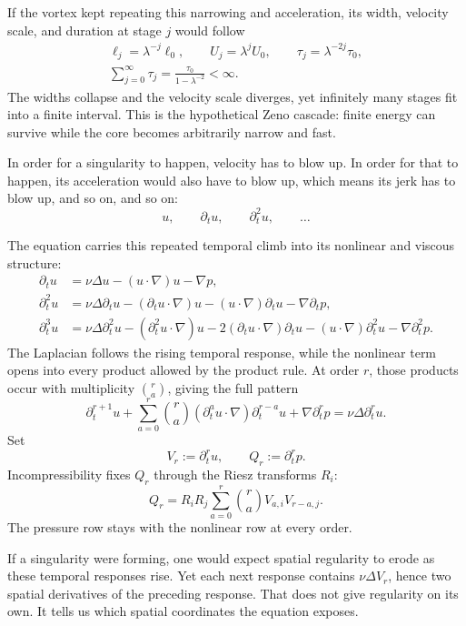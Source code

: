 If the vortex kept repeating this narrowing and acceleration, its width,
velocity scale, and duration at stage \(j\) would follow
\[
\begin{gathered}
 \ell_j=\lambda^{-j}\ell_0,
 \qquad
 U_j=\lambda^jU_0,
 \qquad
 \tau_j=\lambda^{-2j}\tau_0,
 \\
 \sum_{j=0}^{\infty}\tau_j
 =\frac{\tau_0}{1-\lambda^{-2}}<\infty.
\end{gathered}
\]
The widths collapse and the velocity scale diverges, yet infinitely many
stages fit into a finite interval.  This is the hypothetical Zeno cascade:
finite energy can survive while the core becomes arbitrarily narrow and fast.

In order for a singularity to happen, velocity
has to blow up.  In order for that to happen, its acceleration would also have
to blow up, which means its jerk has to blow up, and so on, and so on:
\[
 u,\qquad \partial_tu,\qquad \partial_t^2u,\qquad\ldots
\]

The equation carries this repeated temporal climb into its nonlinear and
viscous structure:
\[
\begin{aligned}
 \partial_tu
 &=\nu\Delta u-(u\!\cdot\nabla)u-\nabla p,\\
 \partial_t^2u
 &=\nu\Delta\partial_tu
   -(\partial_tu\!\cdot\nabla)u
   -(u\!\cdot\nabla)\partial_tu
   -\nabla\partial_tp,\\
 \partial_t^3u
 &=\nu\Delta\partial_t^2u
   -(\partial_t^2u\!\cdot\nabla)u
   -2(\partial_tu\!\cdot\nabla)\partial_tu
   -(u\!\cdot\nabla)\partial_t^2u
   -\nabla\partial_t^2p.
\end{aligned}
\]
The Laplacian follows the rising temporal response, while the nonlinear term
opens into every product allowed by the product rule.  At order \(r\), those
products occur with multiplicity \(\binom ra\), giving the full pattern
\[
 \partial_t^{r+1}u
 +\sum_{a=0}^{r}\binom ra
   (\partial_t^au\!\cdot\nabla)\partial_t^{r-a}u
   +\nabla\partial_t^rp
   =\nu\Delta\partial_t^ru.
\]
Set
\[
 V_r:=\partial_t^ru,
 \qquad
 Q_r:=\partial_t^rp.
\]
Incompressibility fixes \(Q_r\) through the Riesz transforms \(R_i\):
\[
 Q_r
 =R_iR_j\sum_{a=0}^{r}\binom ra
   V_{a,i}V_{r-a,j}.
\]
The pressure row stays with the nonlinear row at every order.

If a singularity were forming, one would expect spatial regularity to erode as
these temporal responses rise.  Yet each next response contains
\(\nu\Delta V_r\), hence two spatial derivatives of the preceding response.
That does not give regularity on its own.  It tells us which spatial
coordinates the equation exposes.

